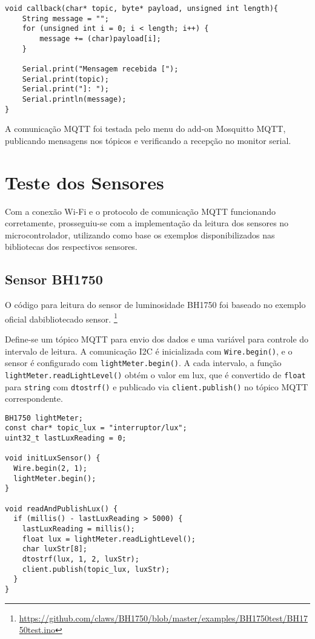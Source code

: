 \documentclass[]{abntex2}
\begin{document}
\begin{verbatim}
void callback(char* topic, byte* payload, unsigned int length){
	String message = "";
	for (unsigned int i = 0; i < length; i++) {
		message += (char)payload[i];
	}

	Serial.print("Mensagem recebida [");
	Serial.print(topic);
	Serial.print("]: ");
	Serial.println(message);
}
\end{verbatim}

A comunicação MQTT foi testada pelo menu do add-on Mosquitto MQTT, publicando
mensagens nos tópicos e verificando a recepção no monitor serial.

\section{Teste dos Sensores}
Com a conexão Wi-Fi e o protocolo de comunicação MQTT funcionando corretamente,
prosseguiu-se com a implementação da leitura dos sensores no microcontrolador,
utilizando como base os exemplos disponibilizados nas bibliotecas dos
respectivos sensores.

\subsection{Sensor BH1750}

O código para leitura do sensor de luminosidade BH1750 foi baseado no exemplo
oficial dabibliotecado sensor.
\footnote{\url{https://github.com/claws/BH1750/blob/master/examples/BH1750test/BH1750test.ino}}

Define-se um tópico MQTT para envio dos dados e uma variável para controle do
intervalo de leitura. A comunicação I2C é inicializada com
\texttt{Wire.begin()}, e o sensor é configurado com
\texttt{lightMeter.begin()}. A cada intervalo, a função
\texttt{lightMeter.readLightLevel()} obtém o valor em lux, que é convertido de
\texttt{float} para \texttt{string} com \texttt{dtostrf()} e publicado via
\texttt{client.publish()} no tópico MQTT correspondente.
\clearpage
\begin{verbatim}
BH1750 lightMeter;
const char* topic_lux = "interruptor/lux";
uint32_t lastLuxReading = 0;

void initLuxSensor() {
  Wire.begin(2, 1);
  lightMeter.begin();
}

void readAndPublishLux() {
  if (millis() - lastLuxReading > 5000) {
    lastLuxReading = millis();
    float lux = lightMeter.readLightLevel();
    char luxStr[8];
    dtostrf(lux, 1, 2, luxStr);
    client.publish(topic_lux, luxStr);
  }
}
\end{verbatim}
\end{document}
